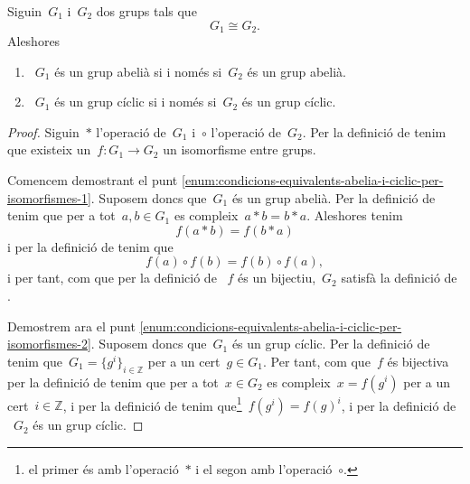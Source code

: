 \documentclass[../../main.tex]{subfiles}
\begin{document}
    \begin{proposition}
        \label{prop:condicions-equivalents-abelia-i-ciclic-per-isomorfismes}
        Siguin~\(G_{1}\) i~\(G_{2}\) dos grups tals que
        \[
            G_{1}\cong G_{2}.
        \]
        Aleshores
        \begin{enumerate}
            \item\label{enum:condicions-equivalents-abelia-i-ciclic-per-isomorfismes-1}~\(G_{1}\) és un grup abelià si i només si~\(G_{2}\) és un grup abelià.
            \item\label{enum:condicions-equivalents-abelia-i-ciclic-per-isomorfismes-2}~\(G_{1}\) és un grup cíclic si i només si~\(G_{2}\) és un grup cíclic.
        \end{enumerate}
    \end{proposition}
    \begin{proof}
        Siguin~\(\ast\) l'operació de~\(G_{1}\) i~\(\circ\) l'operació de~\(G_{2}\).
        Per la definició de  tenim que existeix un~\(f\colon G_{1}\to G_{2}\) un isomorfisme entre grups.

        Comencem demostrant el punt \eqref{enum:condicions-equivalents-abelia-i-ciclic-per-isomorfismes-1}.
        Suposem doncs que~\(G_{1}\) és un grup abelià.
        Per la definició de  tenim que per a tot~\(a,b\in G_{1}\) es compleix~\(a\ast b=b\ast a\).
        Aleshores tenim
        \[
            f(a\ast b)=f(b\ast a)
        \]
        i per la definició de  tenim que
        \[
            f(a)\circ f(b)=f(b)\circ f(a),
        \]
        i per tant, com que per la definició de ~\(f\) és un bijectiu,~\(G_{2}\) satisfà la definició de .

        Demostrem ara el punt \eqref{enum:condicions-equivalents-abelia-i-ciclic-per-isomorfismes-2}.
        Suposem doncs que~\(G_{1}\) és un grup cíclic.
        Per la definició de  tenim que~\(G_{1}=\{g^{i}\}_{i\in\mathbb{Z}}\) per a un cert~\(g\in G_{1}\).
        Per tant, com que~\(f\) és bijectiva per la definició de  tenim que per a tot~\(x\in G_{2}\) es compleix~\(x=f(g^{i})\) per a un cert~\(i\in\mathbb{Z}\), i per la definició de  tenim que\footnote{el primer és amb l'operació~\(\ast\) i el segon amb l'operació~\(\circ\).}~\(f(g^{i})=f(g)^{i}\), i per la definició de ~\(G_{2}\) és un grup cíclic.
    \end{proof}
\end{document}
